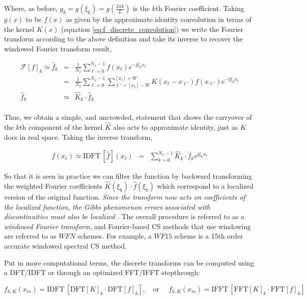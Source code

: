 \documentclass[11pt,titlepage]{report}
\begin{document}
\noindent Where, as before, $g_k = g(\xi_k) = g(\tfrac{2\pi k}{L})$ is the $k$th Fourier coefficient. Taking $g(x)$ to be $f(x)$ as given by the approximate identity convolution in terms of the kernel $K(x)$ (equation \eqref{eq:f_discrete_convolution}) we write the Fourier transform according to the above definition and take its inverse to recover the windowed Fourier transform result,

\begin{eqnarray*}
\mathcal{F}[f]_k  \simeq \hat{f}_k & = & \frac{1}{N_x} \sum_{\ell = 0}^{N_x - 1} f(x_{\ell}) e^{-\text{j}\xi_k x_\ell} \\
& = & \frac{1}{N_x} \sum_{\ell = 0}^{N_x - 1} \sum_{\ell' = [x_{\ell}] - W}^{[x_{\ell}] + W} K(x_{\ell} - x_{\ell'})f(x_{\ell'}) e^{-\text{j}\xi_k x_{\ell}} \\
\hat{f}_k & \simeq & \hat{K}_k\cdot\hat{f}_k \\
\end{eqnarray*}

\noindent Thus, we obtain a simple, and uncrowded, statement that shows the carryover of the $k$th component of the kernel $\hat{K}$ also acts to approximate identity, just as $K$ does in real space. Taking the inverse transform,

\begin{eqnarray*}
f(x_{\ell}) \simeq \text{IDFT}\,[\hat{f}](x_{\ell}) & = & \sum_{k = 0}^{N_x - 1} \hat{K}_k\cdot\hat{f}_ke^{\text{j}\xi_k x_{\ell}}\end{eqnarray*}

\noindent So that it is seen in practice we can filter the function by backward transforming the weighted Fourier coefficients $\hat{K}(\xi_k)\cdot\hat{f}(\xi_k)$ which correspond to a localized version of the original function. \emph{Since the transform now acts on coefficients of the localized function, the Gibbs phenomenon errors associated with discontinuities must also be localized} \cite{Sun05}. The overall procedure is referred to as a \emph{windowed Fourier transform}, and Fourier-based CS methods that use windowing are referred to as $WFN$ schemes. For example, a $WF15$ scheme is a 15th order accurate windowed spectral CS method.

Put in more computational terms, the discrete transforms can be computed using a DFT/IDFT or through an optimized FFT/IFFT stepthrough:

\begin{equation}f_{k,K}(x_m) = \text{IDFT}\,[\text{DFT}[K]_k \cdot \text{DFT}[f]_k], \quad \text{or } \quad f_{k,K}(x_m) = \text{IFFT}\,[\text{FFT}[K]_k \cdot \text{FFT}[f]_k]\label{eq:WFT}\end{equation}
\end{document}
